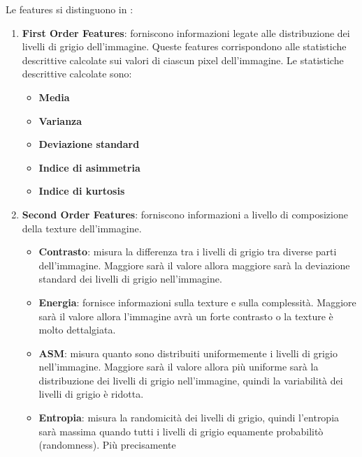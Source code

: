 Le features si distinguono in \cite{explanation-features}:
\begin{enumerate}
      \item \textbf{First Order Features}: forniscono informazioni legate alle
            distribuzione dei livelli di grigio dell'immagine. Queste features
            corrispondono alle statistiche descrittive calcolate sui valori di
            ciascun pixel dell'immagine. Le statistiche descrittive calcolate sono:
            \begin{itemize}
                  \item \textbf{Media}
                  \item \textbf{Varianza}
                  \item \textbf{Deviazione standard}
                  \item \textbf{Indice di asimmetria}
                  \item \textbf{Indice di kurtosis}
            \end{itemize}
      \item \textbf{Second Order Features}: forniscono informazioni a livello di
            composizione della texture dell'immagine.
            \begin{itemize}
                  \item \textbf{Contrasto}: misura la differenza tra i livelli di
                        grigio tra diverse parti dell'immagine. Maggiore sarà il valore
                        allora maggiore sarà la deviazione standard dei livelli di grigio
                        nell'immagine.
                  \item \textbf{Energia}: fornisce informazioni sulla texture e
                        sulla complessità. Maggiore sarà il valore allora l'immagine avrà
                        un forte contrasto o la texture è molto dettalgiata.
                  \item \textbf{ASM}: misura quanto sono distribuiti uniformemente i
                        livelli di grigio nell'immagine. Maggiore sarà il valore allora
                        più uniforme sarà la distribuzione dei livelli di grigio nell'immagine,
                        quindi la variabilità dei livelli di grigio è ridotta.
                  \item \textbf{Entropia}: misura la randomicità dei livelli di
                        grigio, quindi l'entropia sarà massima quando tutti i livelli
                        di grigio equamente probabilitò (randomness). Più precisamente

\end{itemize}
\end{enumerate}
